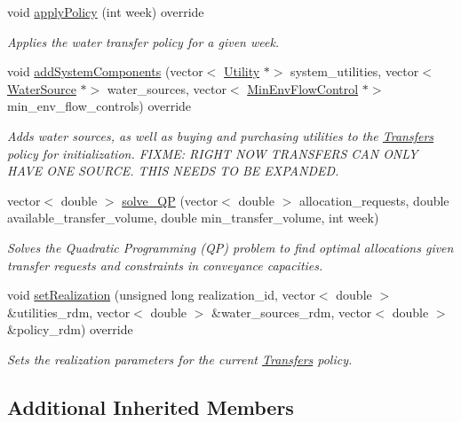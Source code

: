 \begin{DoxyCompactItemize}
void \mbox{\hyperlink{classTransfers_ad9e4e83ff763ac1ba518a19051cd2e69}{apply\+Policy}} (int week) override
\begin{DoxyCompactList}\small\item\em Applies the water transfer policy for a given week. \end{DoxyCompactList}\item 
void \mbox{\hyperlink{classTransfers_a3c1930dbeb1273c1c0be93ad5ca57357}{add\+System\+Components}} (vector$<$ \mbox{\hyperlink{classUtility}{Utility}} $\ast$$>$ system\+\_\+utilities, vector$<$ \mbox{\hyperlink{classWaterSource}{Water\+Source}} $\ast$$>$ water\+\_\+sources, vector$<$ \mbox{\hyperlink{classMinEnvFlowControl}{Min\+Env\+Flow\+Control}} $\ast$$>$ min\+\_\+env\+\_\+flow\+\_\+controls) override
\begin{DoxyCompactList}\small\item\em Adds water sources, as well as buying and purchasing utilities to the \mbox{\hyperlink{classTransfers}{Transfers}} policy for initialization. F\+I\+X\+ME\+: R\+I\+G\+HT N\+OW T\+R\+A\+N\+S\+F\+E\+RS C\+AN O\+N\+LY H\+A\+VE O\+NE S\+O\+U\+R\+CE. T\+H\+IS N\+E\+E\+DS TO BE E\+X\+P\+A\+N\+D\+ED. \end{DoxyCompactList}\item 
vector$<$ double $>$ \mbox{\hyperlink{classTransfers_a06f965588350cc854f3bf3d619416fdc}{solve\+\_\+\+QP}} (vector$<$ double $>$ allocation\+\_\+requests, double available\+\_\+transfer\+\_\+volume, double min\+\_\+transfer\+\_\+volume, int week)
\begin{DoxyCompactList}\small\item\em Solves the Quadratic Programming (QP) problem to find optimal allocations given transfer requests and constraints in conveyance capacities. \end{DoxyCompactList}\item 
void \mbox{\hyperlink{classTransfers_a75342a7c14b2ff69eb2520de240a1131}{set\+Realization}} (unsigned long realization\+\_\+id, vector$<$ double $>$ \&utilities\+\_\+rdm, vector$<$ double $>$ \&water\+\_\+sources\+\_\+rdm, vector$<$ double $>$ \&policy\+\_\+rdm) override
\begin{DoxyCompactList}\small\item\em Sets the realization parameters for the current \mbox{\hyperlink{classTransfers}{Transfers}} policy. \end{DoxyCompactList}\end{DoxyCompactItemize}
\subsection*{Additional Inherited Members}


